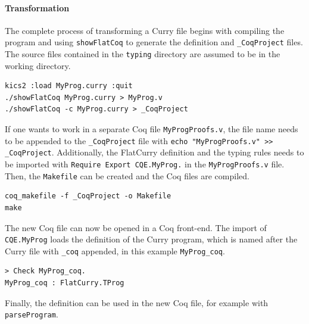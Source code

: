 \documentclass[paper = a4, fleqn, twoside]{scrreprt}
\newcommand{\coqinline}[1]{\texttt{#1}}
\begin{document}
\paragraph{Transformation}
The complete process of transforming a Curry file begins with compiling the program and using \texttt{showFlatCoq} to generate the definition and \coqinline{_CoqProject} files. The source files contained in the \texttt{typing} directory are assumed to be in the working directory.
\begin{verbatim}
kics2 :load MyProg.curry :quit
./showFlatCoq MyProg.curry > MyProg.v
./showFlatCoq -c MyProg.curry > _CoqProject
\end{verbatim}
If one wants to work in a separate Coq file \texttt{MyProgProofs.v}, the file name needs to be appended to the \texttt{\_CoqProject} file with \texttt{echo "MyProgProofs.v" >{}> \_CoqProject}. Additionally, the FlatCurry definition  and the typing rules needs to be imported with \coqinline{Require Export CQE.MyProg.} in the \texttt{MyProgProofs.v} file. Then, the \texttt{Makefile} can be created and the Coq files are compiled.
\begin{verbatim}
coq_makefile -f _CoqProject -o Makefile
make
\end{verbatim}
The new Coq file can now be opened in a Coq front-end. The import of \texttt{CQE.MyProg} loads the definition of the Curry program, which is named after the Curry file with \texttt{\_coq} appended, in this example \texttt{MyProg\_coq}.
\begin{verbatim}
> Check MyProg_coq.
MyProg_coq : FlatCurry.TProg
\end{verbatim}
Finally, the definition can be used in the new Coq file, for example with \texttt{parseProgram}.

\end{document}
